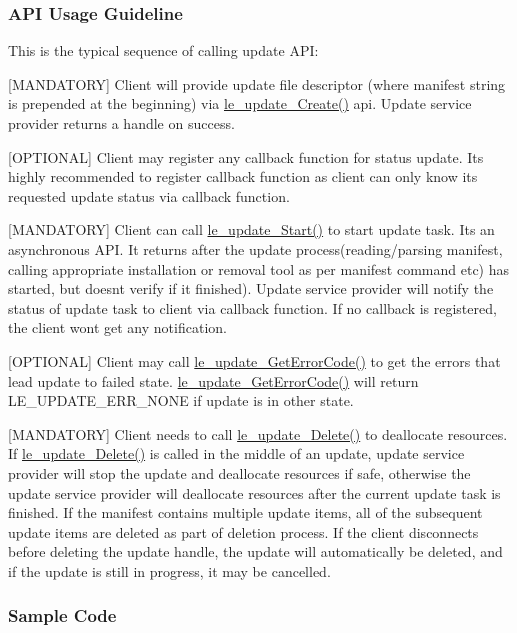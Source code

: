 \hypertarget{c_update_API_Usage_Guideline}{}\subsubsection{A\+P\+I Usage Guideline}\label{c_update_API_Usage_Guideline}
This is the typical sequence of calling update A\+P\+I\+:


\begin{DoxyItemize}
\item \mbox{[}M\+A\+N\+D\+A\+T\+O\+R\+Y\mbox{]} Client will provide update file descriptor (where manifest string is prepended at the beginning) via \hyperlink{le__update__interface_8h_a10d047c2901fcd00c6f4b4785ba76284}{le\+\_\+update\+\_\+\+Create()} api. Update service provider returns a handle on success.
\item \mbox{[}O\+P\+T\+I\+O\+N\+A\+L\mbox{]} Client may register any callback function for status update. It\textquotesingle{}s highly recommended to register callback function as client can only know its requested update status via callback function.
\item \mbox{[}M\+A\+N\+D\+A\+T\+O\+R\+Y\mbox{]} Client can call \hyperlink{le__update__interface_8h_a7b300c8944da0fe9a919bc6bb14157dd}{le\+\_\+update\+\_\+\+Start()} to start update task. It\textquotesingle{}s an asynchronous A\+P\+I. It returns after the update process(reading/parsing manifest, calling appropriate installation or removal tool as per manifest command etc) has started, but doesn\textquotesingle{}t verify if it finished). Update service provider will notify the status of update task to client via callback function. If no callback is registered, the client won\textquotesingle{}t get any notification.
\item \mbox{[}O\+P\+T\+I\+O\+N\+A\+L\mbox{]} Client may call \hyperlink{le__update__interface_8h_a09df8a83ae1fe0b57d34f2afca7ec008}{le\+\_\+update\+\_\+\+Get\+Error\+Code()} to get the errors that lead update to failed state. \hyperlink{le__update__interface_8h_a09df8a83ae1fe0b57d34f2afca7ec008}{le\+\_\+update\+\_\+\+Get\+Error\+Code()} will return L\+E\+\_\+\+U\+P\+D\+A\+T\+E\+\_\+\+E\+R\+R\+\_\+\+N\+O\+N\+E if update is in other state.
\item \mbox{[}M\+A\+N\+D\+A\+T\+O\+R\+Y\mbox{]} Client needs to call \hyperlink{le__update__interface_8h_a64e880b8225cd80571c3f277bbc33137}{le\+\_\+update\+\_\+\+Delete()} to deallocate resources. If \hyperlink{le__update__interface_8h_a64e880b8225cd80571c3f277bbc33137}{le\+\_\+update\+\_\+\+Delete()} is called in the middle of an update, update service provider will stop the update and deallocate resources if safe, otherwise the update service provider will deallocate resources after the current update task is finished. If the manifest contains multiple update items, all of the subsequent update items are deleted as part of deletion process. If the client disconnects before deleting the update handle, the update will automatically be deleted, and if the update is still in progress, it may be cancelled.
\end{DoxyItemize}\hypertarget{c_update_update_example}{}\subsubsection{Sample Code}\label{c_update_update_example}
